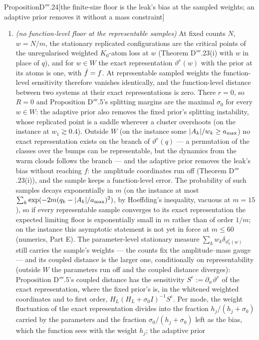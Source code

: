 \begin{thm}{Proposition}{D$'''$.24}[the finite-size floor is the leak's bias at the sampled weights; an adaptive prior
removes it without a mass constraint]
\begin{enumerate}[label=\textup{(\roman*)}]
  \item \emph{(no function-level floor at the representable samples)} At fixed counts $N$, $w = N/m$, the stationary
    replicated configurations are the critical points of the unregularised weighted $K_0$-atom loss at $w$ (Theorem
    D$'''$.23(i) with $w$ in place of $q$), and for $w\in W$ the exact representation $\vartheta^e(w)$ with the prior
    at its atoms is one, with $\hat f = f$. At representable sampled weights the function-level sensitivity therefore
    vanishes identically, and the function-level distance between two systems at their exact representations is
    zero. There $r = 0$, so $R = 0$ and Proposition D$'''$.5's splitting margins are the maximal $\sigma_0$ for every
    $w\in W$: the adaptive prior also removes the fixed prior's splitting instability, whose replicated point is a
    saddle wherever a cluster overshoots (on the instance at $w_1\gtrsim0.4$). Outside $W$ (on the instance some
    $\lvert A_k\rvert/w_k\ge a_{\max}$) no exact representation exists on the branch of $\vartheta^e(q)$ --- a permutation of
    the classes over the bumps can be representable, but the dynamics from the warm clouds follows the branch --- and
    the adaptive prior removes the leak's bias without reaching $f$: the amplitude coordinates run off (Theorem
    D$'''$.23(i)), and the sample keeps a function-level error. The probability of such samples decays exponentially
    in $m$ (on the instance at most $\sum_k\exp(-2m(q_k - \lvert A_k\rvert/a_{\max})^2)$, by Hoeffding's inequality,
    vacuous at $m = 15$), so if every representable sample converges to its exact representation the expected
    limiting floor is exponentially small in $m$ rather than of order $1/m$; on the instance this asymptotic statement
    is not yet in force at $m\le60$ (numerics, Part E). The parameter-level stationary measure
    $\sum_kw_k\delta_{\vartheta^e_k(w)}$ still carries the sample's weights --- the counts fix the amplitude--mass
    gauge --- and its coupled distance is the larger one, conditionally on representability (outside $W$ the
    parameters run off and the coupled distance diverges): Proposition D$'''$.5's coupled distance has the sensitivity
    $S^e := \partial_w\vartheta^e$ of the exact representation, where the fixed prior's is, in the whitened weighted
    coordinates and to first order, $H_L(H_L + \sigma_0I)^{-1}S^e$. Per mode, the weight fluctuation of the exact
    representation divides into the fraction $h_j/(h_j + \sigma_0)$ carried by the parameters and the fraction
    $\sigma_0/(h_j + \sigma_0)$ left as the bias, which the function sees with the weight $h_j$; the adaptive prior

\end{enumerate}
\end{thm}
